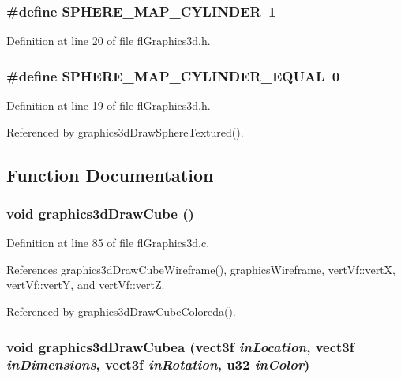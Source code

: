 \subsubsection{\setlength{\rightskip}{0pt plus 5cm}\#define SPHERE\_\-MAP\_\-CYLINDER~1}\label{flGraphics3d_8h_ffdd702c0c99ef101616823e21733537}




Definition at line 20 of file fl\-Graphics3d.h.
\subsubsection{\setlength{\rightskip}{0pt plus 5cm}\#define SPHERE\_\-MAP\_\-CYLINDER\_\-EQUAL~0}\label{flGraphics3d_8h_b90e3cb649b56f510fdef4ced485990b}




Definition at line 19 of file fl\-Graphics3d.h.

Referenced by graphics3d\-Draw\-Sphere\-Textured().

\subsection{Function Documentation}
\subsubsection{\setlength{\rightskip}{0pt plus 5cm}void graphics3d\-Draw\-Cube ()}\label{flGraphics3d_8h_da479ff269707cfe2851e2ba7b964811}




Definition at line 85 of file fl\-Graphics3d.c.

References graphics3d\-Draw\-Cube\-Wireframe(), graphics\-Wireframe, vert\-Vf::vert\-X, vert\-Vf::vert\-Y, and vert\-Vf::vert\-Z.

Referenced by graphics3d\-Draw\-Cube\-Coloreda().
\subsubsection{\setlength{\rightskip}{0pt plus 5cm}void graphics3d\-Draw\-Cubea ({\bf vect3f} {\em in\-Location}, {\bf vect3f} {\em in\-Dimensions}, {\bf vect3f} {\em in\-Rotation}, u32 {\em in\-Color})}\label{flGraphics3d_8h_30788da39402ad6ef14394babdb1f36f}


